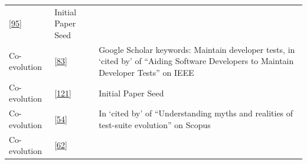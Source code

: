 \documentclass[]{book}
\begin{document}
\begin{longtable}[]{@{}lll@{}}
\begin{minipage}[t]{0.41\columnwidth}
{[}\protect\hyperlink{ref-pinto2012understanding}{95}{]}\strut
\end{minipage} & \begin{minipage}[t]{0.32\columnwidth}\raggedright\strut
Initial Paper Seed\strut
\end{minipage}\tabularnewline
\begin{minipage}[t]{0.19\columnwidth}\raggedright\strut
Co-evolution\strut
\end{minipage} & \begin{minipage}[t]{0.41\columnwidth}\raggedright\strut
{[}\protect\hyperlink{ref-marsavina2014}{83}{]}\strut
\end{minipage} & \begin{minipage}[t]{0.32\columnwidth}\raggedright\strut
Google Scholar keywords: Maintain developer tests, in `cited by' of
``Aiding Software Developers to Maintain Developer Tests'' on IEEE\strut
\end{minipage}\tabularnewline
\begin{minipage}[t]{0.19\columnwidth}\raggedright\strut
Co-evolution\strut
\end{minipage} & \begin{minipage}[t]{0.41\columnwidth}\raggedright\strut
{[}\protect\hyperlink{ref-zaidman2011studying}{121}{]}\strut
\end{minipage} & \begin{minipage}[t]{0.32\columnwidth}\raggedright\strut
Initial Paper Seed\strut
\end{minipage}\tabularnewline
\begin{minipage}[t]{0.19\columnwidth}\raggedright\strut
Co-evolution\strut
\end{minipage} & \begin{minipage}[t]{0.41\columnwidth}\raggedright\strut
{[}\protect\hyperlink{ref-greiler2013}{54}{]}\strut
\end{minipage} & \begin{minipage}[t]{0.32\columnwidth}\raggedright\strut
In `cited by' of ``Understanding myths and realities of test-suite
evolution'' on Scopus\strut
\end{minipage}\tabularnewline
\begin{minipage}[t]{0.19\columnwidth}\raggedright\strut
Co-evolution\strut
\end{minipage} & \begin{minipage}[t]{0.41\columnwidth}\raggedright\strut
{[}\protect\hyperlink{ref-hurdugaci2012}{62}{]}\strut
\end{minipage} & \begin{minipage}[t]{0.32\columnwidth}\raggedright\strut

\end{minipage}
\end{longtable}
\end{document}
